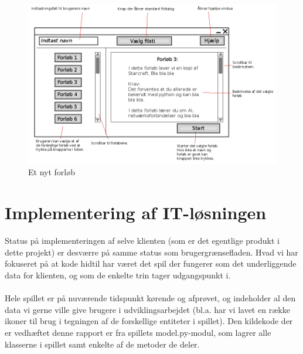 \documentclass[10pt,a4paper,danish]{article}
\begin{document}
\begin{figure}[h]
  \begin{center}
    \includegraphics[scale=0.4]{nytforloeb.png}
    \caption{Et nyt forløb}
    \label{fig:nytforloeb}
  \end{center}
\end{figure}
\newpage

\section{Implementering af IT-løsningen}
Status på implementeringen af selve klienten (som er det egentlige produkt 
i dette projekt) er desværre på samme status som brugergrænsefladen. Hvad vi
har fokuseret på at kode hidtil har været det spil der fungerer som det 
underliggende data for klienten, og som de enkelte trin tager udgangspunkt i.

\paragraph {} 
Hele spillet er på nuværende tidspunkt kørende og afprøvet, og indeholder al den data vi
gerne ville give brugere i udviklingsarbejdet (bl.a. har vi lavet
en række ikoner til brug i tegningen af de forskellige entiteter i spillet). 
Den kildekode der er vedhæftet denne rapport er fra spillets model.py-modul, som
lagrer alle klasserne i spillet samt enkelte af de metoder de deler. 
\end{document}
